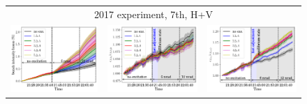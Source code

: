 \documentclass[
prstab
,reprint
,linenumbers
,longbibliography
,preprintnumbers
,showkeys
,amsfonts,amssymb,amsmath
,floatfix
]{revtex4-1}
\newlength{\thirdwidth}
\begin{document}
\begin{figure}
\begin{tabular}{ccc}
    \multicolumn{3}{c}{2017 experiment, 7th, H+V} \\
    \includegraphics[width=\thirdwidth]{2017_bunch_intensity_hv7th_no_damper_avg.png} &
    \includegraphics[width=\thirdwidth]{2017_emith_avg_rel_hv7th_no_damper.png} &
    \includegraphics[width=\thirdwidth]{2017_emitv_avg_rel_hv7th_no_damper.png} \\

\end{tabular}
\end{figure}
\end{document}
